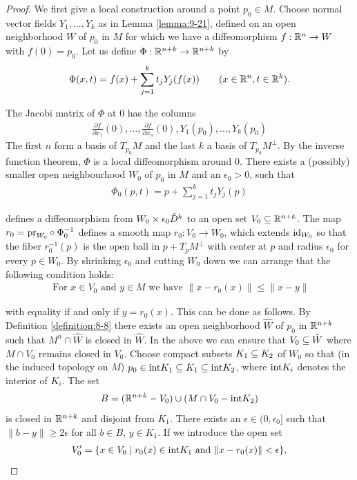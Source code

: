 \begin{proof}
  We first give a local construction around a point $p_0\in M$. Choose normal
vector fields $Y_1, \ldots,Y_k$ as in Lemma \ref{lemma:9-21}, defined on an open neighborhood $W$
of $p_0$ in $M$ for which we have a diffeomorphism $f:{\mathbb{R}}^n\to W$ with $f(0)= p_0$.
Let us define $\Phi:{\mathbb{R}}^{n+k}\to{\ensuremath{\mathbb{R}}}^{n+k}$ by
\begin{align*}
  \Phi(x, t) = f(x) + \sum_{j=1}^{k}{t_jY_j(f(x))}\qquad (x\in{\ensuremath{\mathbb{R}}}^n, t\in {\ensuremath{\mathbb{R}}}^k). 
\end{align*}

The Jacobi matrix of $\Phi$ at 0 has the columns
\begin{align*}
  \frac{\partial f }{\partial x_1}(0), \ldots, 
  \frac{\partial f }{\partial x_n }(0),
  Y_1(p_0), \ldots, Y_k(p_0)
\end{align*}
The first $n$ form a basis of $T_{p_0}M$ and the last $k$ a basis of $T_{p_0}M^\perp$. By the inverse
function theorem, $\Phi$ is a local diffeomorphism around 0. There exists a (possibly)
smaller open neighbourhood $W_0$ of $p_0$ in $M$ and an $\epsilon_0>0$, such that
\begin{align*}
  \Phi_0(p, t) = p + \sum_{j=1}^{k}{t_jY_j(p)}
\end{align*}

defines a diffeomorphism from $W_0\times \epsilon_0\mathring{D}^k$ to an open set $V_0\subseteq {\ensuremath{\mathbb{R}}}^{n+k}$. 
The map $r_0 = \mathrm{pr}_{W_0}\circ \Phi_0^{-1}$ defines a smooth map $r_0:V_0\to W_0$, which extends 
$\operatorname{id}_{W_0}$ so that the fiber $r_0^{-1}(p)$ is the open ball in $p+T_pM^\perp$ with center at $p$ 
and radius $\epsilon_0$ for every $p\in W_0$. By shrinking $\epsilon_0$ and cutting $W_0$ down we can 
arrange that the following condition holds:
\begin{align}\label{eq:9-20}
  \text{ For } x\in V_0 \text{ and } y\in M \text{ we have } \|x-r_0(x)\|\le \|x-y\|
\end{align}

with equality if and only if $y = r_0(x)$. This can be done as follows.
By Definition \ref{definition:8-8} there exists an open neighborhood $\hat{W}$ of $p_0$ 
in ${\mathbb{R}}^{n+k}$ such that $M^n\cap\hat{W}$ is closed in $\hat{W}$. In the above we can 
ensure that $V_0\subseteq \hat{W}$ where $M\cap V_0$ remains closed in $V_0$. Choose compact 
subsets $K_1\subseteq K_2$ of $W_0$ so that (in the induced topology on $M$) $p_0\in\mathrm{int}K_1\subseteq K_1\subseteq\mathrm{int}K_2$,
where $\mathrm{int}K_i$ denotes the interior of $K_i$. The set
\begin{align*}
  B = ({\mathbb{R}}^{n+k}-V_0)\cup (M\cap V_0 - \mathrm{int}K_2)
\end{align*}
is closed in ${\mathbb{R}}^{n+k}$ and disjoint from $K_1$. There exists an $\epsilon\in(0, \epsilon_0]$ such 
that $\|b-y\|\ge 2\epsilon$ for all $b\in B$, $y\in K_1$. If we introduce the open set
\begin{align*}
  V_0' = \{x\in V_0\mid r_0(x)\in\mathrm{int}K_1 \text{ and } \|x-r_0(x)\|<\epsilon\},
\end{align*}


\end{proof}
